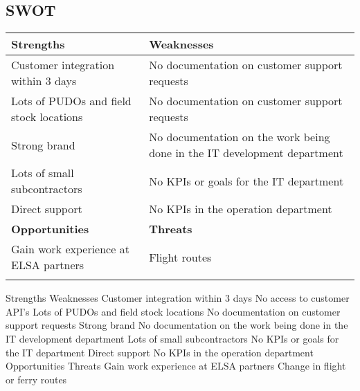 \subsection{SWOT}

\begin{tabular}{ | p{6.4cm} | p{6.4cm} | }
\hline
\textbf{Strengths} & \textbf{Weaknesses} \\ \hline
Customer integration within 3 days & No documentation on customer support requests \\ \hline
Lots of PUDOs and field stock locations & No documentation on customer support requests \\ \hline
Strong brand & No documentation on the work being done in the IT development department \\ \hline
Lots of small subcontractors & No KPIs or goals for the IT department \\ \hline
Direct support & No KPIs in the operation department \\ \hline
\textbf{Opportunities} & \textbf{Threats} \\ \hline
Gain work experience at ELSA partners & Flight routes \\ \hline
 & \\ \hline
\end{tabular}
Strengths
Weaknesses
Customer integration within 3 days
No access to customer API’s
Lots of PUDOs and field stock locations
No documentation on customer support requests
Strong brand
No documentation on the work being done in the IT development department 
Lots of small subcontractors
No KPIs or goals for the IT department
Direct support
No KPIs in the operation department
Opportunities
Threats
Gain work experience at ELSA partners
Change in flight or ferry routes





